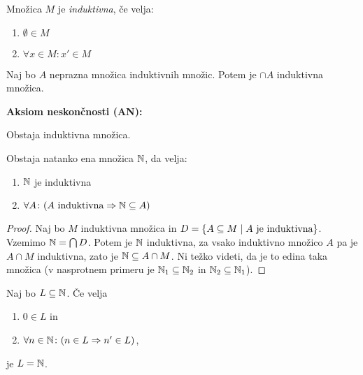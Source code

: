 \documentclass[12pt, a4paper]{article}
\renewcommand{\implies}{\Rightarrow}
\begin{document}
\begin{definicija}
Množica $M$ je \emph{induktivna}, če velja:

\begin{enumerate}
\item $\emptyset\in M$
\item $\forall x\in M\colon x'\in M$
\end{enumerate}
\end{definicija}

\begin{trditev}
Naj bo $A$ neprazna množica induktivnih množic. Potem je $\cap A$ induktivna množica.
\end{trditev}

\obvs

\begin{okvir}
\textbf{Aksiom neskončnosti (AN):}

Obstaja induktivna množica.
\end{okvir}

\begin{izrek}
Obstaja natanko ena množica $\mathbb{N}$, da velja:

\begin{enumerate}
\item $\mathbb{N}$ je induktivna
\item $\forall A\colon(\text{$A$ induktivna}\implies \N\subseteq A)$
\end{enumerate}
\end{izrek}

\begin{proof}
Naj bo $M$ induktivna množica in $D=\left\{A\subseteq M\mid\text{$A$ je induktivna}\right\}$. Vzemimo $\mathbb{N}=\bigcap D$. Potem je $\mathbb{N}$ induktivna, za vsako induktivno množico $A$ pa je $A\cap M$ induktivna, zato je $\mathbb{N}\subseteq A\cap M$. Ni težko videti, da je to edina taka množica (v nasprotnem primeru je $\mathbb{N}_1\subseteq\mathbb{N}_2$ in $\mathbb{N}_2\subseteq\mathbb{N}_1$).
\end{proof}

\begin{izrek}[O indukciji]
Naj bo $L\subseteq\mathbb{N}$. Če velja

\begin{enumerate}
\item $0\in L$ in
\item $\forall n\in\N\colon (n\in L\implies n'\in L)$,
\end{enumerate}

je $L=\mathbb{N}$.
\end{izrek}
\end{document}
